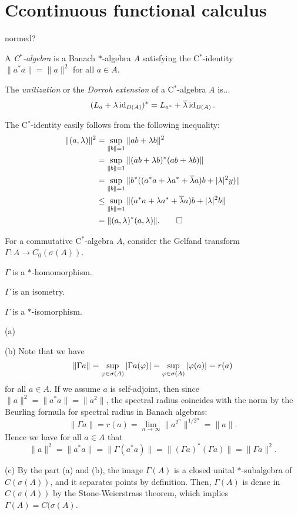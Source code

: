 \documentclass{../../large}
\begin{document}
\section{Ccontinuous functional calculus}
\begin{prb}[$*$-algebras]
normed?
\end{prb}


\begin{prb}[C$^*$-identity]
A \emph{C$^*$-algebra} is a Banach $*$-algebra $A$ satisfying the C$^*$-identity $\|a^*a\|=\|a\|^2$ for all $a\in A$.
\end{prb}


\begin{prb}[Unitization]
The \emph{unitization} or the \emph{Dorroh extension} of a C$^*$-algebra $A$ is...
\[(L_a+\lambda\id_{B(A)})^*=L_{a^*}+\bar\lambda\id_{B(A)}.\]
\end{prb}
\begin{pf}
The C$^*$-identity easily follows from the following inequality:
\begin{align*}
\|(a,\lambda)\|^2&=\sup_{\|b\|=1}\|ab+\lambda b\|^2\\
&=\sup_{\|b\|=1}\|(ab+\lambda b)^*(ab+\lambda b)\|\\
&=\sup_{\|b\|=1}\|b^*((a^*a+\lambda a^*+\bar\lambda a)b+|\lambda|^2y)\|\\
&\le\sup_{\|b\|=1}\|(a^*a+\lambda a^*+\bar\lambda a)b+|\lambda|^2b\|\\
&=\|(a,\lambda)^*(a,\lambda)\|.\qedhere
\end{align*}
\end{pf}




\begin{prb}
For a commutative C$^*$-algebra $A$, consider the Gelfand transform $\Gamma:A\to C_0(\sigma(A))$.
\begin{parts}
\item $\Gamma$ is a $*$-homomorphism.
\item $\Gamma$ is an isometry.
\item $\Gamma$ is a $*$-isomorphism.
\end{parts}
\end{prb}
\begin{pf}
(a)

(b)
Note that we have
\[\|\Gamma a\|=\sup_{\f\in\sigma(A)}|\Gamma a(\f)|=\sup_{\f\in\sigma(A)}|\f(a)|=r(a)\]
for all $a\in A$.
If we assume $a$ is self-adjoint, then since $\|a\|^2=\|a^*a\|=\|a^2\|$, the spectral radius coincides with the norm by the Beurling formula for spectral radius in Banach algebras:
\[\|\Gamma a\|=r(a)=\lim_{n\to\infty}\|a^{2^n}\|^{1/2^n}=\|a\|.\]
Hence we have for all $a\in A$ that
\[\|a\|^2=\|a^*a\|=\|\Gamma(a^*a)\|=\|(\Gamma a)^*(\Gamma a)\|=\|\Gamma a\|^2.\]

(c)
By the part (a) and (b), the image $\Gamma(A)$ is a closed unital $*$-subalgebra of $C(\sigma(A))$, and it separates points by definition.
Then, $\Gamma(A)$ is dense in $C(\sigma(A))$ by the Stone-Weierstrass theorem, which implies $\Gamma(A)=C(\sigma(A)$.
\end{pf}
\end{document}
